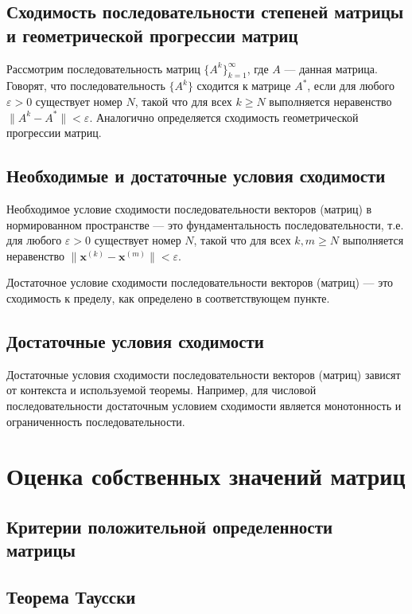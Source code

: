 \documentclass{article}
\begin{document}
\subsection{Сходимость последовательности степеней матрицы и геометрической прогрессии матриц}

Рассмотрим последовательность матриц \( \{A^k\}_{k=1}^{\infty} \), где \( A \) — данная матрица. Говорят, что последовательность \( \{A^k\} \) сходится к матрице \( A^* \), если для любого \( \varepsilon > 0 \) существует номер \( N \), такой что для всех \( k \geq N \) выполняется неравенство \( \|A^k - A^*\| < \varepsilon \). Аналогично определяется сходимость геометрической прогрессии матриц.

\subsection{Необходимые и достаточные условия сходимости}

Необходимое условие сходимости последовательности векторов (матриц) в нормированном пространстве — это фундаментальность последовательности, т.е. для любого \( \varepsilon > 0 \) существует номер \( N \), такой что для всех \( k, m \geq N \) выполняется неравенство \( \|\mathbf{x}^{(k)} - \mathbf{x}^{(m)}\| < \varepsilon \).

Достаточное условие сходимости последовательности векторов (матриц) — это сходимость к пределу, как определено в соответствующем пункте.

\subsection{Достаточные условия сходимости}

Достаточные условия сходимости последовательности векторов (матриц) зависят от контекста и используемой теоремы. Например, для числовой последовательности достаточным условием сходимости является монотонность и ограниченность последовательности.


\section{Оценка собственных значений матриц}

\subsection{Критерии положительной определенности матрицы}
\subsection{Теорема Таусски}
\end{document}
